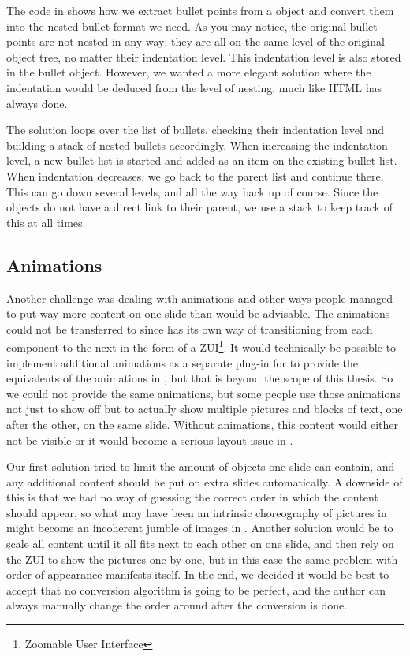     The code in  shows how we extract bullet points from a
     object and convert them into the nested bullet format we
    need. As you may notice, the original bullet points are not nested in any
    way: they are all on the same level of the original object tree, no matter
    their indentation level. This indentation level is also stored in the
    bullet object. However, we wanted a more elegant solution where the
    indentation would be deduced from the level of nesting, much like HTML has
    always done.

    The solution loops over the list of bullets, checking their indentation
    level and building a stack of nested bullets accordingly. When increasing
    the indentation level, a new bullet list is started and added as an item on
    the existing bullet list. When indentation decreases, we go back to the
    parent list and continue there. This can go down several levels, and all
    the way back up of course. Since the objects do not have a direct link to
    their parent, we use a stack to keep track of this at all times.

   \subsection{Animations}

    Another challenge was dealing with animations and other ways people managed
    to put way more content on one slide than would be advisable. The
    animations could not be transferred to \mxp since \mxp has its own way of
    transitioning from each component to the next in the form of a
    ZUI\footnote{Zoomable User Interface}. It would technically be possible to
    implement additional animations as a separate plug-in for \mxp to provide
    the equivalents of the animations in \ppt*, but that is beyond the scope of
    this thesis. So we could not provide the same animations, but some people
    use those animations not just to show off but to actually show multiple
    pictures and blocks of text, one after the other, on the same slide.
    Without animations, this content would either not be visible or it would
    become a serious layout issue in \mxp.
   
    Our first solution tried to limit the amount of objects one slide can
    contain, and any additional content should be put on extra slides
    automatically. A downside of this is that we had no way of guessing the
    correct order in which the content should appear, so what may have been an
    intrinsic choreography of pictures in \ppt might become an incoherent
    jumble of images in \mxp. Another solution would be to scale all content
    until it all fits next to each other on one slide, and then rely on the ZUI
    to show the pictures one by one, but in this case the same problem with
    order of appearance manifests itself. In the end, we decided it would be
    best to accept that no conversion algorithm is going to be perfect, and the
    author can always manually change the order around after the conversion is
    done.

